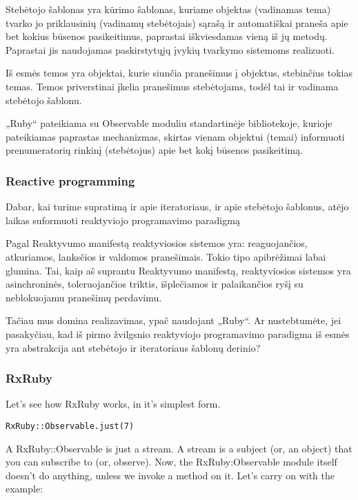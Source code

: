 Stebėtojo šablonas yra kūrimo šablonas, kuriame objektas (vadinamas tema) tvarko jo priklausinių (vadinamų stebėtojais) sąrašą ir automatiškai praneša apie bet kokius būsenos pasikeitimus, paprastai iškviesdamas vieną iš jų metodų. Paprastai jis naudojamas paskirstytųjų įvykių tvarkymo sistemoms realizuoti.

Iš esmės temos yra objektai, kurie siunčia pranešimus į objektus, stebinčius tokias temas. Temos priverstinai įkelia pranešimus stebėtojams, todėl tai ir vadinama stebėtojo šablonu.

„Ruby“ pateikiama su Observable moduliu standartinėje bibliotekoje, kurioje pateikiamas paprastas mechanizmas, skirtas vienam objektui (temai) informuoti prenumeratorių rinkinį (stebėtojus) apie bet kokį būsenos pasikeitimą.

\subsubsection{Reactive programming}

Dabar, kai turime supratimą ir apie iteratoriaus, ir apie stebėtojo šablonus, atėjo laikas suformuoti reaktyviojo programavimo paradigmą

Pagal Reaktyvumo manifestą reaktyviosios sistemos yra: reaguojančios, atkuriamos, lanksčios ir valdomos pranešimais. Tokio tipo apibrėžimai labai glumina. Tai, kaip aš suprantu Reaktyvumo manifestą, reaktyviosios sistemos yra asinchroninės, toleruojančios triktis, išplečiamos ir palaikančios ryšį su neblokuojamu pranešimų perdavimu.

Tačiau mus domina realizavimas, ypač naudojant „Ruby“. Ar nustebtumėte, jei pasakyčiau, kad iš pirmo žvilgsnio reaktyviojo programavimo paradigma iš esmės yra abstrakcija ant stebėtojo ir iteratoriaus šablonų derinio?

\subsubsection{RxRuby}

Let’s see how RxRuby works, in it’s simplest form.

\begin{lstlisting}[]
  RxRuby::Observable.just(7)
\end{lstlisting}

A RxRuby::Observable is just a stream. A stream is a subject (or, an object) that you can subscribe to (or, observe). Now, the RxRuby:Observable module itself doesn’t do anything, unless we invoke a method on it. Let’s carry on with the example:

